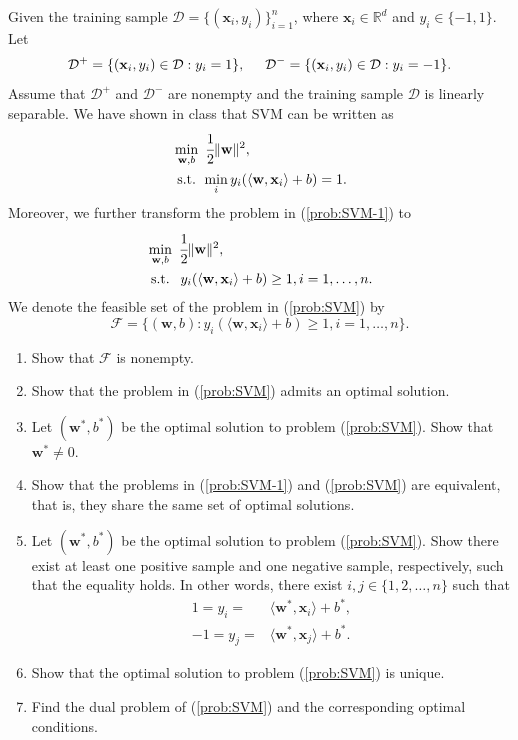 \documentclass[11pt,letter,notitlepage]{article}
\begin{document}
\begin{exercise}
	Given the training sample $\mathcal{D}=\{ (\textbf{x}_i,y_i) \}_{i=1}^n$, where $\textbf{x}_i \in \mathbb{R}^d$ and $y_i \in \{ -1,1 \}$. Let
	\begin{align*}
		\mathcal{D}^+=\{(\textbf{x}_i,y_i)\in\mathcal{D}:y_i=1\},\hspace{5mm}\mathcal{D}^-=\{(\textbf{x}_i,y_i)\in\mathcal{D}:y_i=-1\}.
	\end{align*}
	Assume that $\mathcal{D}^+$ and $\mathcal{D}^-$ are nonempty and the training sample $\mathcal{D}$ is linearly separable. We have shown in class that SVM can be written as
	\begin{align}\label{prob:SVM-1}
		 & \min_{\textbf{w},b}\,\,\cfrac{1}{2}\| \textbf{w} \|^2,                                     \\
		 & \text{ s.t. } \min_i y_{i} ( \langle \textbf{w}, \textbf{x}_i \rangle + b ) = 1. \nonumber
	\end{align}
	Moreover, we further transform the problem in (\ref{prob:SVM-1}) to
	\begin{align}\label{prob:SVM}
		 & \min_{\textbf{w},b}\,\,\cfrac{1}{2}\| \textbf{w} \|^2,                                                   \\
		 & \text{ s.t. }\,\, y_{i} ( \langle \textbf{w}, \textbf{x}_i \rangle + b ) \geq 1, i=1,\ldots,n. \nonumber
	\end{align}
	We denote the feasible set of the problem in (\ref{prob:SVM}) by $$\mathcal{F}=\{(\mathbf{w},b):y_{i} ( \langle \textbf{w}, \textbf{x}_i \rangle + b ) \geq 1, i=1,\ldots,n\}.$$

	\begin{enumerate}
		\item Show that $\mathcal{F}$ is nonempty.
		\item Show that the problem in (\ref{prob:SVM}) admits an optimal solution.
		\item Let $(\textbf{w}^*,b^*)$ be the optimal solution to problem (\ref{prob:SVM}). Show that $\mathbf{w}^*\neq0$.
		\item Show that the problems in (\ref{prob:SVM-1}) and (\ref{prob:SVM}) are equivalent, that is, they share the same set of optimal solutions.
		\item Let $(\textbf{w}^*,b^*)$ be the optimal solution to problem (\ref{prob:SVM}). Show there exist at least one positive sample and one negative sample, respectively, such that the equality holds. In other words, there exist $i,j \in \{ 1,2,\dots,n \}$ such that
		      \begin{align*}
			      1=y_i =  & \langle \textbf{w}^*, \textbf{x}_i \rangle + b^*, \\
			      -1=y_j = & \langle \textbf{w}^*, \textbf{x}_j \rangle + b^*.
		      \end{align*}
		\item Show that the optimal solution to problem (\ref{prob:SVM}) is unique.
		\item Find the dual problem of (\ref{prob:SVM}) and the corresponding optimal conditions.
	\end{enumerate}

\end{exercise}
\end{document}

